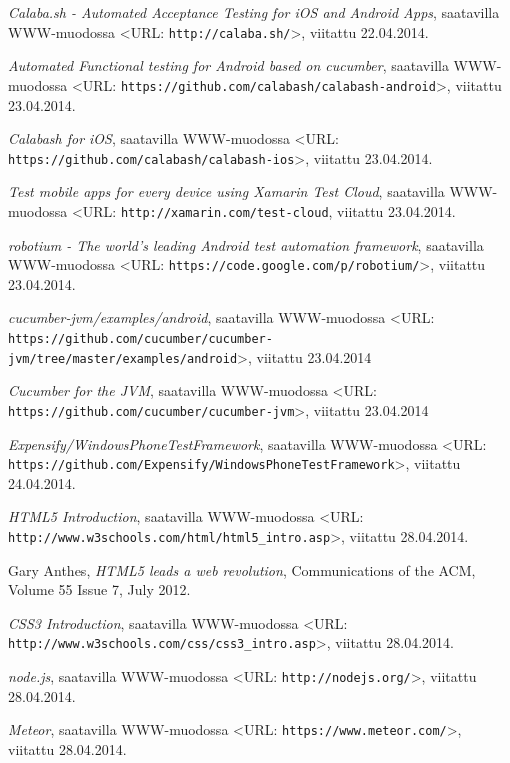 \documentclass[finnish,nonumbib,nocopyright]{gradu2}
\begin{document}
\begin{thebibliography}{9}
\textit{Calaba.sh - Automated Acceptance Testing for iOS and Android Apps}, saatavilla WWW-muodossa
<URL: \texttt{http://calaba.sh/}>, viitattu 22.04.2014.

\textit{Automated Functional testing for Android based on cucumber}, saatavilla WWW-muodossa
<URL: \texttt{https://github.com/calabash/calabash-android}>, viitattu 23.04.2014.

\textit{Calabash for iOS}, saatavilla WWW-muodossa
<URL: \texttt{https://github.com/calabash/calabash-ios}>, viitattu 23.04.2014.

\textit{Test mobile apps for every device using Xamarin Test Cloud}, saatavilla WWW-muodossa
<URL: \texttt{http://xamarin.com/test-cloud}, viitattu 23.04.2014.

\textit{robotium - The world's leading Android test automation framework}, saatavilla WWW-muodossa
<URL: \texttt{https://code.google.com/p/robotium/}>, viitattu 23.04.2014.

\textit{cucumber-jvm/examples/android}, saatavilla WWW-muodossa
<URL: \texttt{https://github.com/cucumber/cucumber-jvm/tree/master/examples/android}>, viitattu 23.04.2014

\textit{Cucumber for the JVM}, saatavilla WWW-muodossa
<URL: \texttt{https://github.com/cucumber/cucumber-jvm}>, viitattu 23.04.2014

\textit{Expensify/WindowsPhoneTestFramework}, saatavilla WWW-muodossa
<URL: \texttt{https://github.com/Expensify/WindowsPhoneTestFramework}>, viitattu 24.04.2014.

\textit{HTML5 Introduction}, saatavilla WWW-muodossa
<URL: \texttt{http://www.w3schools.com/html/html5\_intro.asp}>, viitattu 28.04.2014.

Gary Anthes, \textit{HTML5 leads a web revolution},
Communications of the ACM, Volume 55 Issue 7, July 2012.

\textit{CSS3 Introduction}, saatavilla WWW-muodossa
<URL: \texttt{http://www.w3schools.com/css/css3\_intro.asp}>, viitattu 28.04.2014.

\textit{node.js}, saatavilla WWW-muodossa
<URL: \texttt{http://nodejs.org/}>, viitattu 28.04.2014.

\textit{Meteor}, saatavilla WWW-muodossa
<URL: \texttt{https://www.meteor.com/}>, viitattu 28.04.2014.


\end{thebibliography}
\end{document}
